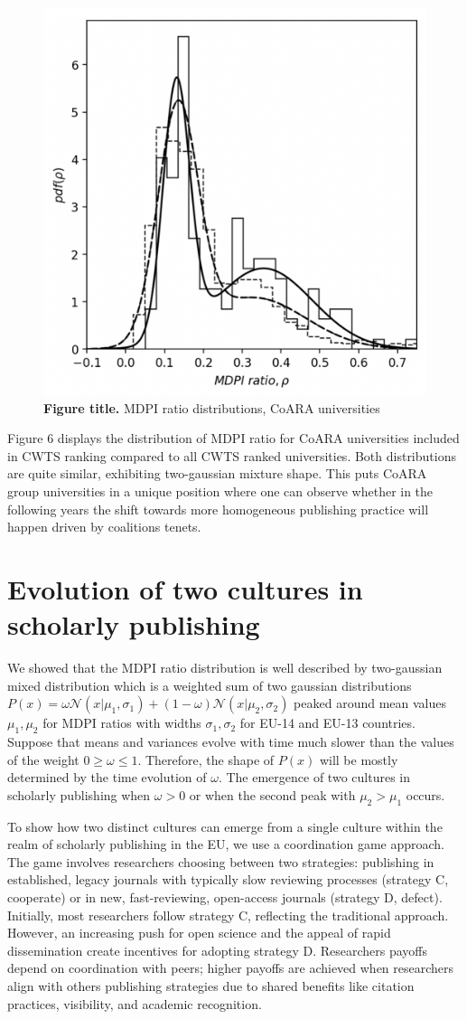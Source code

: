\documentclass[amsfonts, amssymb, prl, superscriptaddress, notitlepage, twocolumn, nofootinbib]{revtex4-2}
\begin{document}
\begin{figure}
    \centering
    \includegraphics[width=.6\linewidth]{Fig05.png}
    \caption{\label{fig:fig5} {\bf Figure title.} MDPI ratio distributions, CoARA universities  
}
\end{figure}

Figure 6 displays the distribution of MDPI ratio for CoARA universities included in CWTS ranking compared to all CWTS ranked universities. Both distributions are quite similar, exhibiting two-gaussian mixture shape. This puts CoARA group universities in a unique position where one can observe whether in the following years the shift towards more homogeneous publishing practice will happen driven by coalitions tenets.   

\section{Evolution of two cultures in scholarly publishing }
We showed that the MDPI ratio distribution is well described by two-gaussian mixed distribution which is a weighted sum of two gaussian distributions $P(x) = \omega\mathcal{N}(x|\mu_1, \sigma_1) + (1-\omega)\mathcal{N}(x|\mu_2, \sigma_2)$ peaked around mean values $\mu_1, \mu_2$ for MDPI ratios with widths $\sigma_1, \sigma_2$ for EU-14 and EU-13 countries. Suppose that means and variances evolve with time much slower than the values of the weight $0\ge\omega\le 1$.  Therefore, the shape of $P(x)$ will be mostly determined by the time evolution of $\omega$. The emergence of two cultures in scholarly publishing when $\omega > 0$ or when the second peak with $\mu_2 >\mu_1$ occurs.  

To show how two distinct cultures can emerge from a single culture within the realm of scholarly publishing in the EU, we use a coordination game approach. The game involves researchers choosing between two strategies: publishing in established, legacy journals with typically slow reviewing processes (strategy C, cooperate) or in new, fast-reviewing, open-access journals (strategy D, defect). Initially, most researchers follow strategy C, reflecting the traditional approach. However, an increasing push for open science and the appeal of rapid dissemination create incentives for adopting strategy D. Researchers payoffs depend on coordination with peers; higher payoffs are achieved when researchers align with others publishing strategies due to shared benefits like citation practices, visibility, and academic recognition.  
\end{document}
